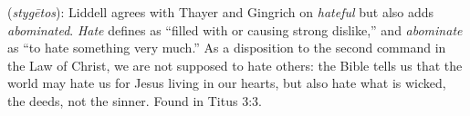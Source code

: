 \item[Hateful,]

(\textit{stygētos}):
Liddell agrees with Thayer and Gingrich on \emph{hateful} but also adds \emph{abominated}. \emph{Hate} defines as ``filled with or causing strong dislike,'' and \emph{abominate} as ``to hate something very much.'' As a disposition to the second command in the Law of Christ, we are not supposed to hate others: the Bible tells us that the world may hate us for Jesus living in our hearts, but also hate what is wicked, the deeds, not the sinner.
Found in Titus 3:3.
